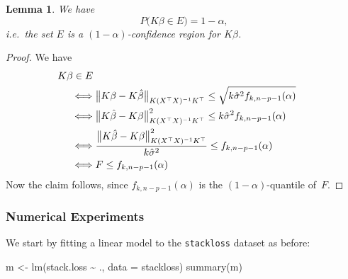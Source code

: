 \documentclass[
  a4paper,
]{article}
\newenvironment{Shaded}{\begin{snugshade}}{\end{snugshade}}
\newcommand{\AttributeTok}[1]{\textcolor[rgb]{0.77,0.63,0.00}{#1}}
\newcommand{\FunctionTok}[1]{\textcolor[rgb]{0.00,0.00,0.00}{#1}}
\newcommand{\NormalTok}[1]{#1}
\newcommand{\OtherTok}[1]{\textcolor[rgb]{0.56,0.35,0.01}{#1}}
\newcommand{\SpecialCharTok}[1]{\textcolor[rgb]{0.00,0.00,0.00}{#1}}
\newtheorem{lemma}{Lemma}[section]
\theoremstyle{definition}
\theoremstyle{definition}
\theoremstyle{definition}
\theoremstyle{definition}
\theoremstyle{remark}
\begin{document}
\begin{lemma}
We have
\begin{equation*}
  P\bigl( K\beta \in E \bigr)
  = 1 - \alpha,
\end{equation*}
\emph{i.e.}~the set \(E\) is a \((1-\alpha)\)-confidence region for \(K\beta\).
\end{lemma}

\begin{proof}
We have
\begin{align*}
  &\hskip-5mm K\beta \in E \\
  &\Longleftrightarrow
      \bigl\| K\beta - K \hat\beta \bigr\|_{K(X^\top X)^{-1} K^\top}
        \leq \sqrt{k \hat\sigma^2 f_{k,n-p-1}(\alpha)} \\
  &\Longleftrightarrow
      \bigl\| K\hat\beta - K\beta \bigr\|_{K(X^\top X)^{-1} K^\top}^2
        \leq k \hat\sigma^2 f_{k,n-p-1}(\alpha) \\
  &\Longleftrightarrow
      \frac{\bigl\| K\hat\beta - K\beta \bigr\|_{K(X^\top X)^{-1} K^\top}^2}
           {k \hat\sigma^2}
        \leq f_{k,n-p-1}(\alpha) \\
  &\Longleftrightarrow
    F \leq f_{k,n-p-1}(\alpha)
\end{align*}
Now the claim follows, since \(f_{k,n-p-1}(\alpha)\) is the
\((1-\alpha)\)-quantile of~\(F\).
\end{proof}

\hypertarget{numerical-experiments}{%
\subsubsection{Numerical Experiments}\label{numerical-experiments}}

We start by fitting a linear model to the \texttt{stackloss} dataset as
before:

\begin{Shaded}
\begin{Highlighting}[]
\NormalTok{m }\OtherTok{\textless{}{-}} \FunctionTok{lm}\NormalTok{(stack.loss }\SpecialCharTok{\textasciitilde{}}\NormalTok{ ., }\AttributeTok{data =}\NormalTok{ stackloss)}
\FunctionTok{summary}\NormalTok{(m)}
\end{Highlighting}
\end{Shaded}
\end{document}
